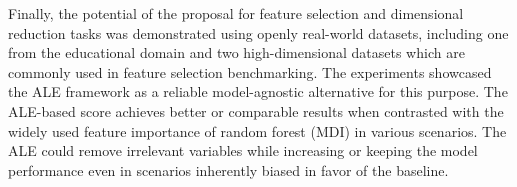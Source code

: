Finally, the potential of the proposal for feature selection and dimensional reduction tasks was demonstrated using openly real-world datasets, including one from the educational domain and two high-dimensional datasets which are commonly used in feature selection benchmarking. The experiments showcased the ALE framework as a reliable model-agnostic alternative for this purpose. The ALE-based score achieves better or comparable results when contrasted with the widely used feature importance of random forest (MDI) in various scenarios. The ALE could remove irrelevant variables while increasing or keeping the model performance even in scenarios inherently biased in favor of the baseline.
